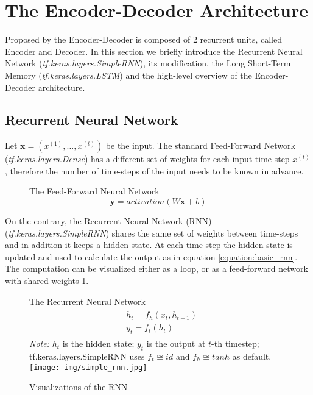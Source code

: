 \section {The Encoder-Decoder Architecture}

Proposed by \citet{sutskever2014sequence} the Encoder-Decoder is composed of 2 recurrent units, called Encoder and Decoder. In this section we briefly introduce the Recurrent Neural Network (\emph{tf.keras.layers.SimpleRNN}), its modification, the Long Short-Term Memory (\emph{tf.keras.layers.LSTM}) \citep{hochreiter1997} and the high-level overview of the Encoder-Decoder architecture.

\subsection{Recurrent Neural Network}

Let $\boldsymbol{x}=(x^{(1)},\dots,x^{(t)})$ be the input. The standard Feed-Forward Network (\emph{tf.keras.layers.Dense}) has a different set of weights for each input time-step $x^{(t)}$, therefore the number of time-steps of the input needs to be known in advance.

\begin{figure}[!h]
\centering
The Feed-Forward Neural Network
\begin{equation}
\boldsymbol{y} = activation(W\boldsymbol{x} + b) \mbox{}
\end{equation}
\end{figure}
On the contrary, the Recurrent Neural Network (RNN) \citep{rumelhart_rnn1988} (\emph{tf.keras.layers.SimpleRNN}) shares the same set of weights between time-steps and in addition it keeps a hidden state. At each time-step the hidden state is updated and used to calculate the output as in equation \ref{equation:basic_rnn}. The computation can be visualized either as a loop, or as a feed-forward network with shared weights \ref{figure:visualization_rnn}.


\begin{figure}[!h]
    \centering
    The Recurrent Neural Network
    \begin{align} \label{equation:basic_rnn}
    \begin{split}
        &h_t = f_h(x_t, h_{t-1}) \\
        &y_t = f_t(h_t)
    \end{split}
    \end{align}
    \footnotesize{\textit{Note:} $h_t$ is the hidden state; $y_t$ is the output at $t$-th timestep; tf.keras.layers.SimpleRNN uses $f_t \cong id$ and $f_h \cong tanh$ as default.}
    \texttt{[image: img/simple\_rnn.jpg]}
    \caption{Visualizations of the RNN} \label{figure:visualization_rnn}
\end{figure}

